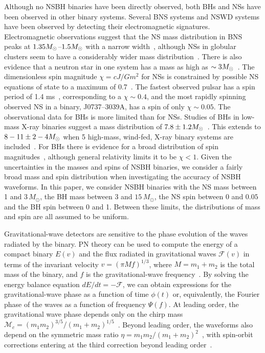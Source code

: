 Although no \ac{NSBH} binaries have been directly observed, both \acp{BH} and \acp{NS}
have been observed in other binary systems. Several \ac{BNS} systems and
\ac{NSWD} systems have been observed by detecting their electromagnetic
signatures. Electromagnetic observations suggest that the \ac{NS} mass
distribution in \ac{BNS} peaks at $1.35 M_\odot$--$1.5 M_\odot$ with a narrow
width~\cite{Kiziltan:2010ct}, although \acp{NS} in globular clusters seem to
have a considerably wider mass distribution~\cite{Kiziltan:2010ct}.  There is
also evidence that a neutron star in one system has a mass as high as $\sim 3
M_\odot$~\cite{Freire:2007jd}.  The dimensionless spin magnitude $\chi = cJ/Gm^2$ for
\acp{NS} is constrained by possible \ac{NS} equations of state to a maximum of
0.7~\cite{Lo:2010bj}.  The fastest observed pulsar has a spin period
of 1.4 ms~\cite{Hessels:2006ze}, corresponding to a $\chi \sim 0.4$, and the
most rapidly spinning observed \ac{NS} in a binary, J0737--3039A, has a spin
of only $\chi \sim 0.05$.  The observational data for \acp{BH} is more limited
than for \acp{NS}.  Studies of \acp{BH} in low-mass X-ray
binaries suggest a mass distribution of $7.8 \pm 1.2 M_\odot$~\cite{Ozel:2010su}. This extends to $8-11 \pm 2-4 M_\odot$ when 5
high-mass, wind-fed, X-ray binary systems are included~\cite{Farr:2010tu}. For
\acp{BH} there is evidence for a broad distribution of spin
magnitudes~\cite{Miller:2009cw}, although general relativity limits it to be
$\chi < 1$. Given the uncertainties in the masses and spins of
\ac{NSBH} binaries, we consider a fairly broad mass and spin
distribution when investigating the accuracy of \ac{NSBH} waveforms.
In this paper, we consider \ac{NSBH} binaries with the \ac{NS} mass between 1
and $3\, M_\odot$, the \ac{BH} mass between $3$ and $15\, M_\odot$, the
\ac{NS} spin between 0 and $0.05$ and the
\ac{BH} spin between 0 and 1. Between these limits, the distributions of mass and spin are all
assumed to be uniform. 

Gravitational-wave detectors are sensitive to the phase evolution of the waves radiated
by the binary. \ac{PN} theory can be used to compute the
energy of a compact binary $E(v)$ and the flux radiated in gravitational waves
$\mathcal{F}(v)$ in terms of the invariant velocity $v = (\pi M f)^{1/3}$,
where $M = m_1 + m_2$ is the total mass of the binary, and $f$ is the
gravitational-wave frequency~\cite{Blanchet:2006zz}. By solving the energy
balance equation $dE/dt = - \mathcal{F}$, we can obtain expressions for the
gravitational-wave phase as a function of time $\phi(t)$ or, equivalently, the
Fourier phase of the waves as a function of frequency $\Psi(f)$. At leading
order, the gravitational wave phase depends only on the chirp mass
$\mathcal{M}_c = (m_1 m_2)^{3/5} / (m_1 + m_2)^{1/5}$~\cite{Peters:1963ux}.
Beyond leading order, the waveforms also depend on the symmetric mass
ratio $\eta = m_1 m_2 / (m_1 + m_2)^2$~\cite{Wiseman:1993aj,Blanchet:1995fg,Blanchet:1995ez,Blanchet:1996pi,
Blanchet:2001ax, Blanchet:2004ek}, with spin-orbit 
corrections entering at the third correction beyond leading order~\cite{Kidder:1992fr,
Kidder:1995zr,Arun:2008kb,Blanchet:2012sm,Bohe:2013cla}.


